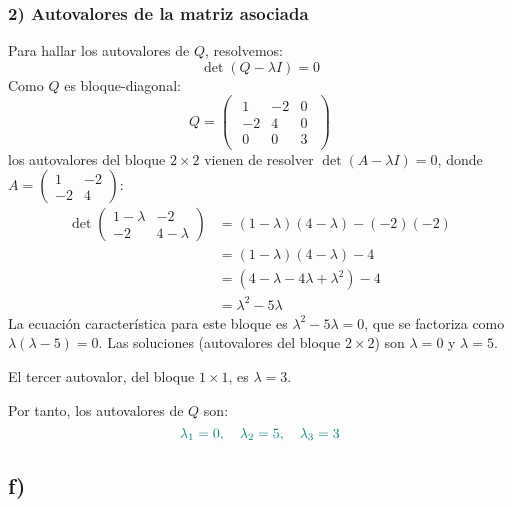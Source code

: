\documentclass{article}
\begin{document}
\subsubsection*{2) Autovalores de la matriz asociada}

Para hallar los autovalores de \(Q\), resolvemos:
\[
\det(Q-\lambda I)=0
\]
Como \(Q\) es bloque-diagonal:
\[
Q=
\begin{pmatrix}
\begin{array}{cc|c}
1 & -2 & 0\\
-2&  4 & 0\\ \hline
0 &  0 & 3
\end{array}
\end{pmatrix}
\]
los autovalores del bloque \(2\times 2\) vienen de resolver $\det(A - \lambda I) = 0$, donde $A = \begin{pmatrix} 1 & -2 \\ -2 & 4 \end{pmatrix}$:
\begin{align*} %
\det\begin{pmatrix}
1-\lambda & -2\\
-2 & 4-\lambda
\end{pmatrix}
&= (1-\lambda)(4-\lambda)-(-2)(-2) \\
&= (1-\lambda)(4-\lambda)-4 \\
&= (4 - \lambda - 4\lambda + \lambda^2) - 4 \\
&= \lambda^2 - 5\lambda
\end{align*}
La ecuación característica para este bloque es $\lambda^2 - 5\lambda = 0$, que se factoriza como $\lambda(\lambda - 5) = 0$.
Las soluciones (autovalores del bloque $2 \times 2$) son $\lambda=0$ y $\lambda=5$.

El tercer autovalor, del bloque \(1\times1\), es $\lambda=3$.

Por tanto, los autovalores de $Q$ son:
\[
\color{teal} %
\lambda_1 = 0,\quad \lambda_2 = 5,\quad \lambda_3 = 3
\]













\subsection*{f)}
\end{document}
